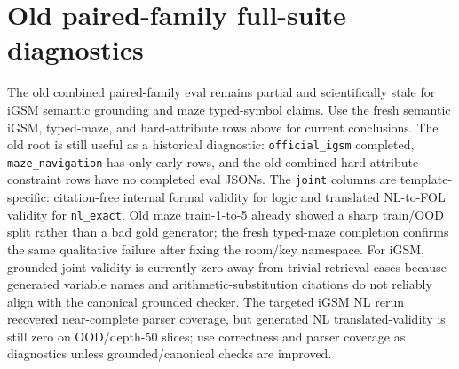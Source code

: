 \documentclass[10pt]{article}
\begin{document}
\section{Old paired-family full-suite diagnostics}
The old combined paired-family eval remains partial and scientifically stale for iGSM semantic grounding and maze typed-symbol claims. Use the fresh semantic iGSM, typed-maze, and hard-attribute rows above for current conclusions. The old root is still useful as a historical diagnostic: \texttt{official\_igsm} completed, \texttt{maze\_navigation} has only early rows, and the old combined hard attribute-constraint rows have no completed eval JSONs. The \texttt{joint} columns are template-specific: citation-free internal formal validity for logic and translated NL-to-FOL validity for \texttt{nl\_exact}. Old maze train-1-to-5 already showed a sharp train/OOD split rather than a bad gold generator; the fresh typed-maze completion confirms the same qualitative failure after fixing the room/key namespace. For iGSM, grounded joint validity is currently zero away from trivial retrieval cases because generated variable names and arithmetic-substitution citations do not reliably align with the canonical grounded checker. The targeted iGSM NL rerun recovered near-complete parser coverage, but generated NL translated-validity is still zero on OOD/depth-50 slices; use correctness and parser coverage as diagnostics unless grounded/canonical checks are improved.
\end{document}
